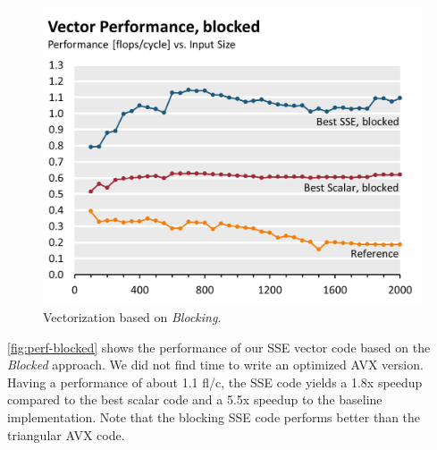 \begin{figure}[htb]\centering
  \includegraphics[width=\linewidth]{plot_data/blocked_vector_performance.png}
  \caption{Vectorization based on \emph{Blocking}.}
  \label{fig:perf-blocked}
\end{figure}
\autoref{fig:perf-blocked} shows the performance of our SSE vector code
based on the \emph{Blocked} approach. We did not find time to write an
optimized AVX version. Having a performance of about 1.1 fl/c, the SSE code
yields a 1.8x speedup compared to the best scalar code and a 5.5x speedup
to the baseline implementation. Note that the blocking SSE code performs
better than the triangular AVX code.

